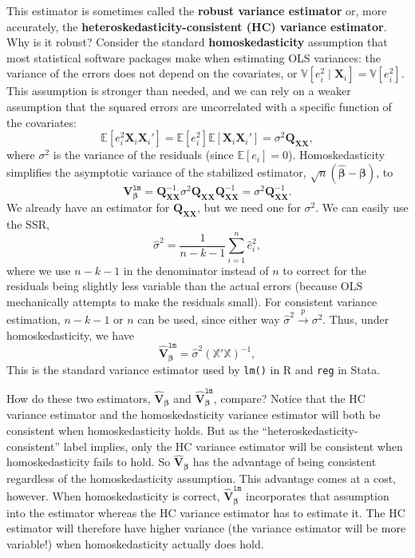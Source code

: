 \documentclass[
  letterpaper,
  DIV=11,
  numbers=noendperiod]{scrreprt}
\newcommand{\mb}{\symbf}
\newcommand{\E}{\mathbb{E}}
\newcommand{\V}{\mathbb{V}}
\newcommand{\X}{\mb{X}}
\newcommand{\Xmat}{\mathbb{X}}
\newcommand{\bfbeta}{\mb{\beta}}
\newcommand{\bhat}{\widehat{\mb{\beta}}}
\newcommand{\inprob}{\overset{p}{\to}}
\theoremstyle{plain}
\theoremstyle{definition}
\theoremstyle{definition}
\theoremstyle{remark}
\begin{document}
This estimator is sometimes called the \textbf{robust variance
estimator} or, more accurately, the
\textbf{heteroskedasticity-consistent (HC) variance estimator}. Why is
it robust? Consider the standard \textbf{homoskedasticity} assumption
that most statistical software packages make when estimating OLS
variances: the variance of the errors does not depend on the covariates,
or \(\V[e_{i}^{2} \mid \X_{i}] = \V[e_{i}^{2}]\). This assumption is
stronger than needed, and we can rely on a weaker assumption that the
squared errors are uncorrelated with a specific function of the
covariates: \[ 
\E[e_{i}^{2}\X_{i}\X_{i}'] = \E[e_{i}^{2}]\E[\X_{i}\X_{i}'] = \sigma^{2}\mb{Q}_{\X\X}, 
\] where \(\sigma^2\) is the variance of the residuals (since
\(\E[e_{i}] = 0\)). Homoskedasticity simplifies the asymptotic variance
of the stabilized estimator, \(\sqrt{n}(\bhat - \bfbeta)\), to \[ 
\mb{V}^{\texttt{lm}}_{\bfbeta} = \mb{Q}_{\X\X}^{-1}\sigma^{2}\mb{Q}_{\X\X}\mb{Q}_{\X\X}^{-1} = \sigma^2\mb{Q}_{\X\X}^{-1}.
\] We already have an estimator for \(\mb{Q}_{\X\X}\), but we need one
for \(\sigma^2\). We can easily use the SSR, \[ 
\widehat{\sigma}^{2} = \frac{1}{n-k-1} \sum_{i=1}^{n} \widehat{e}_{i}^{2},
\] where we use \(n-k-1\) in the denominator instead of \(n\) to correct
for the residuals being slightly less variable than the actual errors
(because OLS mechanically attempts to make the residuals small). For
consistent variance estimation, \(n-k -1\) or \(n\) can be used, since
either way \(\widehat{\sigma}^2 \inprob \sigma^2\). Thus, under
homoskedasticity, we have \[ 
\widehat{\mb{V}}_{\bfbeta}^{\texttt{lm}} = \widehat{\sigma}^{2}\left(\Xmat'\Xmat\right)^{{-1}},
\] This is the standard variance estimator used by \texttt{lm()} in R
and \texttt{reg} in Stata.

How do these two estimators, \(\widehat{\mb{V}}_{\bfbeta}\) and
\(\widehat{\mb{V}}_{\bfbeta}^{\texttt{lm}}\), compare? Notice that the
HC variance estimator and the homoskedasticity variance estimator will
both be consistent when homoskedasticity holds. But as the
``heteroskedasticity-consistent'' label implies, only the HC variance
estimator will be consistent when homoskedasticity fails to hold. So
\(\widehat{\mb{V}}_{\bfbeta}\) has the advantage of being consistent
regardless of the homoskedasticity assumption. This advantage comes at a
cost, however. When homoskedasticity is correct,
\(\widehat{\mb{V}}_{\bfbeta}^{\texttt{lm}}\) incorporates that
assumption into the estimator whereas the HC variance estimator has to
estimate it. The HC estimator will therefore have higher variance (the
variance estimator will be more variable!) when homoskedasticity
actually does hold.
\end{document}
